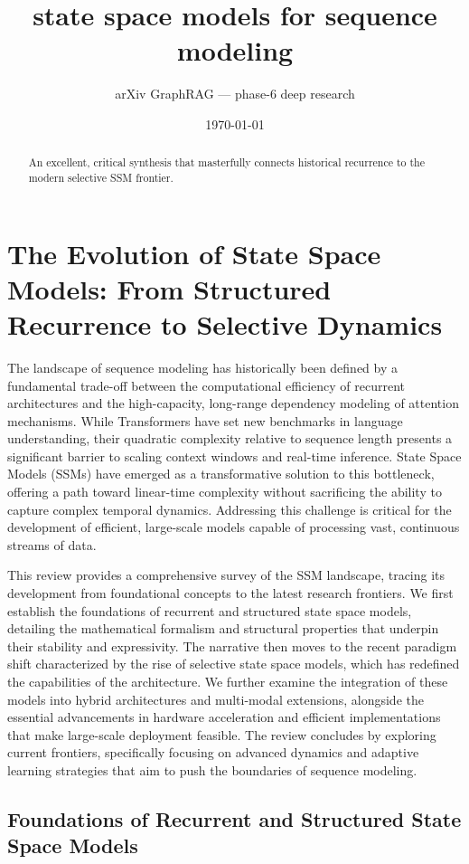 \documentclass[11pt]{article}
\title{state space models for sequence modeling}
\author{arXiv GraphRAG --- phase-6 deep research}
\date{\today}
\begin{document}
\maketitle

\begin{abstract}
An excellent, critical synthesis that masterfully connects historical recurrence to the modern selective SSM frontier.
\end{abstract}

\section{The Evolution of State Space Models: From Structured Recurrence to Selective Dynamics}

The landscape of sequence modeling has historically been defined by a fundamental trade-off between the computational efficiency of recurrent architectures and the high-capacity, long-range dependency modeling of attention mechanisms. While Transformers have set new benchmarks in language understanding, their quadratic complexity relative to sequence length presents a significant barrier to scaling context windows and real-time inference. State Space Models (SSMs) have emerged as a transformative solution to this bottleneck, offering a path toward linear-time complexity without sacrificing the ability to capture complex temporal dynamics. Addressing this challenge is critical for the development of efficient, large-scale models capable of processing vast, continuous streams of data.

This review provides a comprehensive survey of the SSM landscape, tracing its development from foundational concepts to the latest research frontiers. We first establish the foundations of recurrent and structured state space models, detailing the mathematical formalism and structural properties that underpin their stability and expressivity. The narrative then moves to the recent paradigm shift characterized by the rise of selective state space models, which has redefined the capabilities of the architecture. We further examine the integration of these models into hybrid architectures and multi-modal extensions, alongside the essential advancements in hardware acceleration and efficient implementations that make large-scale deployment feasible. The review concludes by exploring current frontiers, specifically focusing on advanced dynamics and adaptive learning strategies that aim to push the boundaries of sequence modeling.

\subsection{Foundations of Recurrent and Structured State Space Models}
\end{document}

